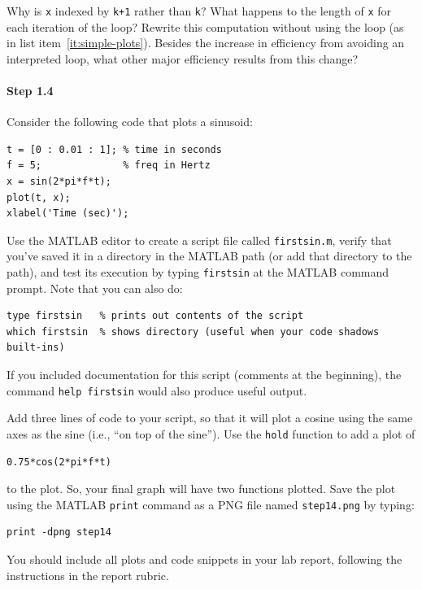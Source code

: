 Why is \verb|x| indexed by \verb|k+1| rather than \verb|k|? What
happens to the length of \verb|x| for each iteration of the loop?
Rewrite this computation without using the loop (as in list
item~\ref{it:simple-plots}). Besides the increase in efficiency from
avoiding an interpreted loop, what other major efficiency results from
this change?

\paragraph{Step 1.4} Consider the following code that plots a
sinusoid:
\begin{lstlisting}[style=Matlab-editor,basicstyle=\mlttfamily\small]
t = [0 : 0.01 : 1]; % time in seconds
f = 5;              % freq in Hertz
x = sin(2*pi*f*t);
plot(t, x);
xlabel('Time (sec)');
\end{lstlisting}

Use the MATLAB editor to create a script file called
\texttt{firstsin.m}, verify that you've saved it in a directory in the
MATLAB path (or add that directory to the path), and test its
execution by typing \texttt{firstsin} at the MATLAB command
prompt. Note that you can also do:
\begin{lstlisting}[style=Matlab-editor,basicstyle=\mlttfamily\small]
type firstsin   % prints out contents of the script
which firstsin  % shows directory (useful when your code shadows built-ins)
\end{lstlisting}

If you included documentation for this script (comments at the
beginning), the command \verb|help firstsin| would also produce useful
output.

Add three lines of code to your script, so that it will plot a cosine
using the same axes as the sine (i.e., ``on top of the sine''). Use
the \texttt{hold} function to add a plot of
\begin{lstlisting}[style=Matlab-editor,basicstyle=\mlttfamily\small]
0.75*cos(2*pi*f*t)
\end{lstlisting}
to the plot. So, your final graph will have two functions
plotted. Save the plot using the MATLAB \texttt{print} command as a
PNG file named \texttt{step14.png} by typing:
\begin{lstlisting}[style=Matlab-editor,basicstyle=\mlttfamily\small]
print -dpng step14
\end{lstlisting}

You should include all plots and code snippets in your lab report,
following the instructions in the report rubric.


